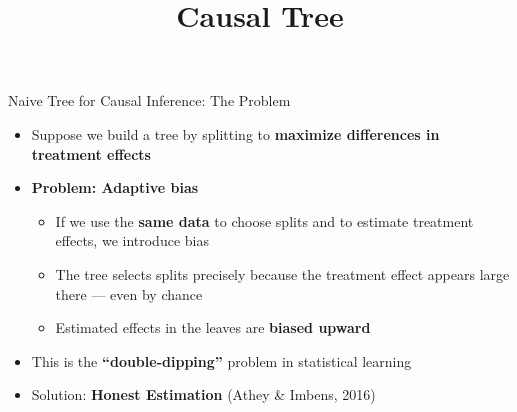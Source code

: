 \documentclass[hyperref={pdfpagelabels=false}]{beamer}
\begin{document}
\begin{frame}{Naive Tree for Causal Inference: The Problem}
	\begin{itemize}
		\item Suppose we build a tree by splitting to \textbf{maximize differences in treatment effects}
		\vspace{0.3cm}
		\item \textbf{Problem: Adaptive bias}
		\vspace{0.2cm}
		\begin{itemize}
			\item If we use the \textbf{same data} to choose splits and to estimate treatment effects, we introduce bias
			\vspace{0.2cm}
			\item The tree selects splits precisely because the treatment effect appears large there --- even by chance
			\vspace{0.2cm}
			\item Estimated effects in the leaves are \textbf{biased upward}
		\end{itemize}
		\vspace{0.3cm}
		\item This is the \textbf{``double-dipping''} problem in statistical learning
		\vspace{0.3cm}
		\item Solution: \textbf{Honest Estimation} (Athey \& Imbens, 2016)
	\end{itemize}
\end{frame}




\title[]
{Causal Tree}

\author{}
\institute{}
\date{}

\begin{frame}{}
	\titlepage
\end{frame}
\end{document}

